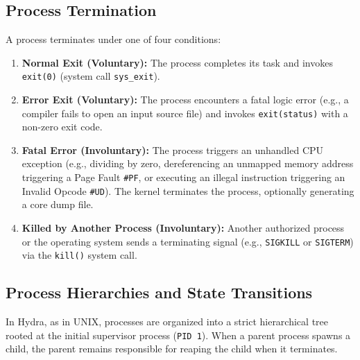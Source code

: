 \subsection{Process Termination}
A process terminates under one of four conditions:
\begin{enumerate}
    \item \textbf{Normal Exit (Voluntary):} The process completes its task and invokes \texttt{exit(0)} (system call \texttt{sys\_exit}).
    \item \textbf{Error Exit (Voluntary):} The process encounters a fatal logic error (e.g., a compiler fails to open an input source file) and invokes \texttt{exit(status)} with a non-zero exit code.
    \item \textbf{Fatal Error (Involuntary):} The process triggers an unhandled CPU exception (e.g., dividing by zero, dereferencing an unmapped memory address triggering a Page Fault \texttt{\#PF}, or executing an illegal instruction triggering an Invalid Opcode \texttt{\#UD}). The kernel terminates the process, optionally generating a core dump file.
    \item \textbf{Killed by Another Process (Involuntary):} Another authorized process or the operating system sends a terminating signal (e.g., \texttt{SIGKILL} or \texttt{SIGTERM}) via the \texttt{kill()} system call.
\end{enumerate}

\subsection{Process Hierarchies and State Transitions}
In Hydra, as in UNIX, processes are organized into a strict hierarchical tree rooted at the initial supervisor process (\texttt{PID~1}). When a parent process spawns a child, the parent remains responsible for reaping the child when it terminates.

